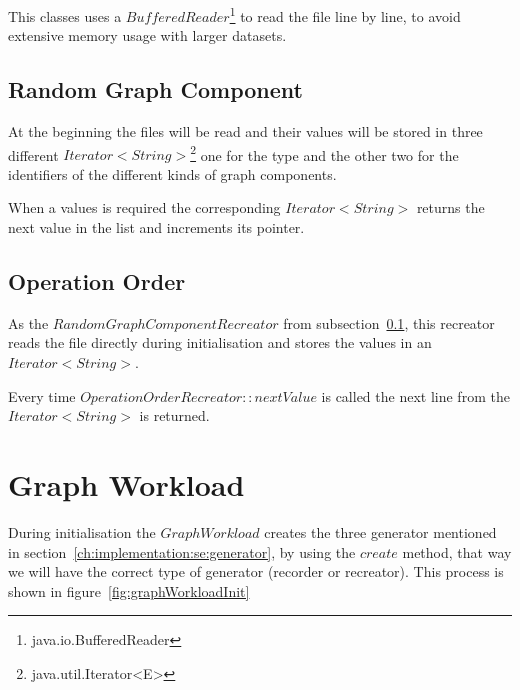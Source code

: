This classes uses a $ BufferedReader $\footnote{java.io.BufferedReader} to read the file line by line,
to avoid extensive memory usage with larger datasets.

\subsection{Random Graph Component}
\label{ch:implementation:se:randomGraphComponentRecreator}
At the beginning the files will be read and their values will be stored in three different $ Iterator<String> $\footnote{java.util.Iterator<E>} one for the type and the other two for the identifiers of the different kinds of graph components.

When a values is required the corresponding $ Iterator<String> $ returns the next value in the list and increments its pointer.

\subsection{Operation Order}
As the $ RandomGraphComponentRecreator $ from subsection~\ref{ch:implementation:se:randomGraphComponentRecreator},
this recreator reads the file directly during initialisation and stores the values in an $ Iterator<String> $.

Every time $ OperationOrderRecreator::nextValue $ is called the next line from the $ Iterator<String> $ is returned.

\section{Graph Workload}
\label{ch:implementation:se:graphWorkload}
During initialisation the $ GraphWorkload $ creates the three generator mentioned in section~\ref{ch:implementation:se:generator},
by using the $ create $ method,
that way we will have the correct type of generator (recorder or recreator).
This process is shown in figure~\ref{fig:graphWorkloadInit}

